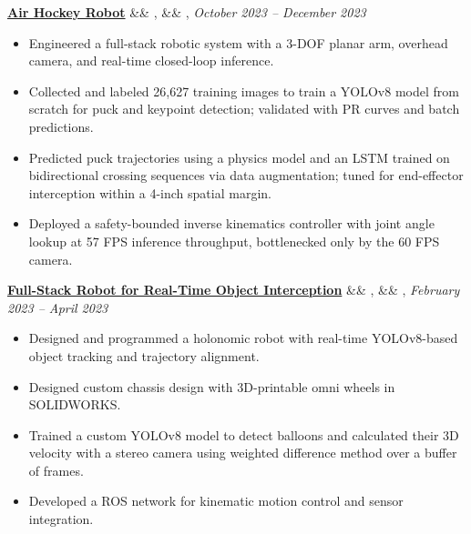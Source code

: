\documentclass[letterpaper,10pt]{article}
\newcommand{\experience}[5]{%
    \noindent\textbf{#1}%
    \ifx&#2&
    \else
        , \textit{#2}%
    \fi
    \ifx&#3&
    \else
        , #3%
    \fi
    \hfill \textit{#4} \\
    \vspace{-6.8mm}%
    \begin{itemize}[itemsep=-5pt]
        \setlength{\itemindent}{0em}
        #5
    \end{itemize}
    \vspace{1mm}
}
\begin{document}
\experience
    {\href{https://ryanbarry.me/projects/robotics/air-hockey-robot/}{Air Hockey Robot}}
    {}
    {}
    {October 2023 – December 2023}
    {
        \item Engineered a full-stack robotic system with a 3-DOF planar arm, overhead camera, and real-time closed-loop inference.
        \item Collected and labeled 26,627 training images to train a YOLOv8 model from scratch for puck and keypoint detection; validated with PR curves and batch predictions.
        \item Predicted puck trajectories using a physics model and an LSTM trained on bidirectional crossing sequences via data augmentation; tuned for end-effector interception within a 4-inch spatial margin.
        \item Deployed a safety-bounded inverse kinematics controller with joint angle lookup at 57 FPS inference throughput, bottlenecked only by the 60 FPS camera.
    }



    
\experience
    {\href{https://ryanbarry.me/projects/robotics/omnidirectional-robot/}{Full-Stack Robot for Real-Time Object Interception}}
    {}
    {}
    {February 2023 – April 2023}
    {

        \item Designed and programmed a holonomic robot with real-time YOLOv8-based object tracking and trajectory alignment.
        \item Designed custom chassis design with 3D-printable omni wheels in SOLIDWORKS.
        \item Trained a custom YOLOv8 model to detect balloons and calculated their 3D velocity with a stereo camera using weighted difference method over a buffer of frames.
        \item Developed a ROS network for kinematic motion control and sensor integration.
    }
    
\end{document}
